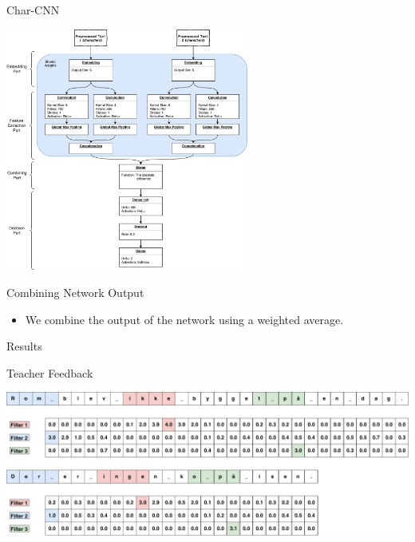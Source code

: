 \documentclass[10pt]{beamer}
\begin{document}
\begin{frame}[fragile]{Char-CNN}
    \begin{center}
        \includegraphics[width=0.6\textwidth]{../../macom/summary/pictures/model}
    \end{center}
\end{frame}

\begin{frame}[fragile]{Combining Network Output}
    \begin{itemize}
        \item We combine the output of the network using a weighted average.
    \end{itemize}
\end{frame}

\begin{frame}[fragile]{Results}
\end{frame}

\begin{frame}[fragile]{Teacher Feedback}
    \begin{center}
        \includegraphics[width=\textwidth]{../../report/pictures/discussion/teacher_feedback_example}
    \end{center}
\end{frame}
\end{document}
